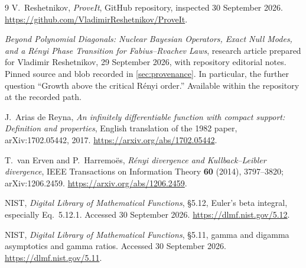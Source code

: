 \documentclass[11pt,a4paper]{article}
\numberwithin{equation}{section}
\theoremstyle{definition}\newaliascnt{definition}{theorem}
\theoremstyle{remark}\newaliascnt{remark}{theorem}
\begin{document}
\begin{thebibliography}{9}
V.~Reshetnikov, \emph{ProveIt}, GitHub repository, inspected 30 September 2026.
\url{https://github.com/VladimirReshetnikov/ProveIt}.

\emph{Beyond Polynomial Diagonals: Nuclear Bayesian Operators, Exact Null
Modes, and a R\'enyi Phase Transition for Fabius--Rvachev Laws}, research
article prepared for Vladimir Reshetnikov, 29 September 2026, with repository
editorial notes. Pinned source and blob recorded in \cref{sec:provenance}.
In particular, the further question ``Growth above the critical R\'enyi
order.'' Available within the repository \cite{repo} at the recorded path.

J.~Arias de Reyna, \emph{An infinitely differentiable function with compact
support: Definition and properties}, English translation of the 1982 paper,
arXiv:1702.05442, 2017.
\url{https://arxiv.org/abs/1702.05442}.

T.~van Erven and P.~Harremo\"es, \emph{R\'enyi divergence and
Kullback--Leibler divergence}, IEEE Transactions on Information Theory
\textbf{60} (2014), 3797--3820; arXiv:1206.2459.
\url{https://arxiv.org/abs/1206.2459}.

NIST, \emph{Digital Library of Mathematical Functions}, \S5.12,
Euler's beta integral, especially Eq.~5.12.1. Accessed 30 September 2026.
\url{https://dlmf.nist.gov/5.12}.

NIST, \emph{Digital Library of Mathematical Functions}, \S5.11,
gamma and digamma asymptotics and gamma ratios. Accessed 30 September 2026.
\url{https://dlmf.nist.gov/5.11}.
\end{thebibliography}
\end{document}
